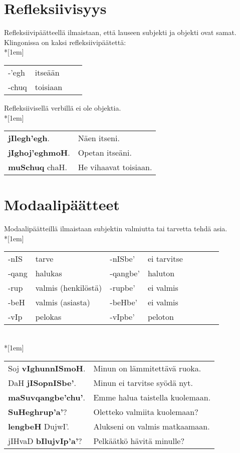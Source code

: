 \documentclass{book}
\begin{document}
\section{Refleksiivisyys}

Refleksiivipäätteellä ilmaistaan, että lauseen subjekti ja objekti ovat samat.
Klingonissa on kaksi refleksiivipäätettä:\\*[1em]
\begin{tabular}{Bl Il}
    -'egh & itseään \\
    -chuq & toisiaan \\
\end{tabular}

Refleksiivisellä verbillä ei ole objektia.\\*[1em]
\begin{tabular}{l l}
    \textbf{jIlegh'egh}. & Näen itseni. \\
    \textbf{jIghoj'eghmoH}. & Opetan itseäni. \\
    \textbf{muSchuq} chaH. & He vihaavat toisiaan. \\
\end{tabular}

\section{Modaalipäätteet}
\label{sec:modaali}

Modaalipäätteillä ilmaistaan subjektin valmiutta tai tarvetta tehdä asia.\\*[1em]
\begin{tabular}{Bl Il | Bl Il}
    -nIS & tarve & -nISbe' & ei tarvitse \\
    -qang & halukas & -qangbe' & haluton \\
    -rup & valmis (henkilöstä) & -rupbe' & ei valmis \\
    -beH & valmis (asiasta) & -beHbe' & ei valmis \\
    -vIp & pelokas & -vIpbe' & peloton \\
\end{tabular}
\\*[1em]
\begin{tabular}{l l}
    Soj \textbf{vIghunnISmoH}. & Minun on lämmitettävä ruoka. \\
    DaH \textbf{jISopnISbe'}. & Minun ei tarvitse syödä nyt. \\
    \textbf{maSuvqangbe'chu'}. & Emme halua taistella kuolemaan. \\
    \textbf{SuHeghrup'a'}? & Oletteko valmiita kuolemaan? \\
    \textbf{lengbeH} DujwI'. & Alukseni on valmis matkaamaan. \\
    jIHvaD \textbf{bIlujvIp'a'}? & Pelkäätkö hävitä minulle? \\
\end{tabular}
\end{document}
